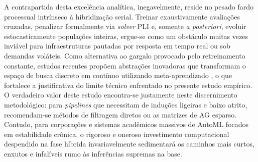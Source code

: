 \documentclass[12pt]{article}
\begin{document}
A contrapartida desta excelência analítica, inegavelmente, reside no pesado fardo processual intrínseco à hibridização serial. Treinar exaustivamente avaliações cruzadas, penalizar formalmente via \textit{solver} PLI e, somente \textit{a posteriori}, evoluir estocasticamente populações inteiras, ergue-se como um obstáculo muitas vezes inviável para infraestruturas pautadas por resposta em tempo real ou sob demandas voláteis. Como alternativa ao gargalo provocado pelo retreinamento constante, estudos recentes propõem abstrações inovadoras que transformam o espaço de busca discreto em contínuo utilizando meta-aprendizado \cite{metafs2023}, o que fortalece a justificativa do limite técnico enfrentado no presente estudo empírico. O verdadeiro valor deste estudo encontra-se justamente neste discernimento metodológico: para \textit{pipelines} que necessitam de induções ligeiras e baixo atrito, recomendam-se métodos de filtragem diretos ou as matrizes de AG esparso. Contudo, para corporações e sistemas acadêmicos massivos de AutoML focados em estabilidade crônica, o rigoroso e oneroso investimento computacional despendido na fase híbrida invariavelmente sedimentará os caminhos mais curtos, enxutos e infalíveis rumo às inferências supremas na base.



\end{document}
